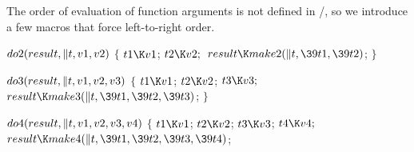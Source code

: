 The order of evaluation of function arguments is not defined in \CEE/,
so we introduce a few macros that force left-to-right order.

\Y\B\4\D$\\{do2}(\\{result},\|t,\\{v1},\\{v2})$ \6
${}\{{}$\5
\1${}\\{t1}\K\\{v1}{}$;\5
${}\\{t2}\K\\{v2};{}$\6
${}\\{result}\K\\{make2}(\|t,\39\\{t1},\39\\{t2}){}$;\5
${}\}{}$\2\par
\B\4\D$\\{do3}(\\{result},\|t,\\{v1},\\{v2},\\{v3})$ \6
${}\{{}$\5
\1${}\\{t1}\K\\{v1}{}$;\5
${}\\{t2}\K\\{v2}{}$;\5
${}\\{t3}\K\\{v3};{}$\6
${}\\{result}\K\\{make3}(\|t,\39\\{t1},\39\\{t2},\39\\{t3}){}$;\5
${}\}{}$\2\par
\B\4\D$\\{do4}(\\{result},\|t,\\{v1},\\{v2},\\{v3},\\{v4})$ \6
${}\{{}$\5
\1${}\\{t1}\K\\{v1}{}$;\5
${}\\{t2}\K\\{v2}{}$;\5
${}\\{t3}\K\\{v3}{}$;\5
${}\\{t4}\K\\{v4};{}$\6
${}\\{result}\K\\{make4}(\|t,\39\\{t1},\39\\{t2},\39\\{t3},\39\\{t4}){}$;\5
